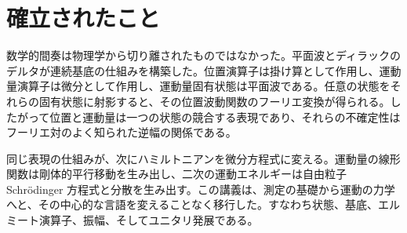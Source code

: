 \section{確立されたこと}

数学的間奏は物理学から切り離されたものではなかった。平面波とディラックのデルタが連続基底の仕組みを構築した。位置演算子は掛け算として作用し、運動量演算子は微分として作用し、運動量固有状態は平面波である。任意の状態をそれらの固有状態に射影すると、その位置波動関数のフーリエ変換が得られる。したがって位置と運動量は一つの状態の競合する表現であり、それらの不確定性はフーリエ対のよく知られた逆幅の関係である。

同じ表現の仕組みが、次にハミルトニアンを微分方程式に変える。運動量の線形関数は剛体的平行移動を生み出し、二次の運動エネルギーは自由粒子 Schr\"odinger 方程式と分散を生み出す。この講義は、測定の基礎から運動の力学へと、その中心的な言語を変えることなく移行した。すなわち状態、基底、エルミート演算子、振幅、そしてユニタリ発展である。
